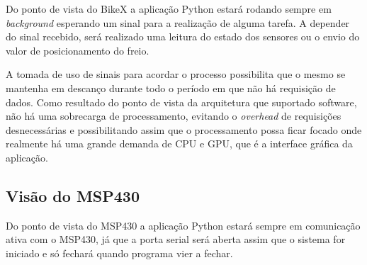Do ponto de vista do BikeX a aplicação Python estará rodando sempre em \textit{background} esperando um sinal para a realização de alguma tarefa. A depender do sinal recebido, será realizado uma leitura do estado dos sensores ou o envio do valor de posicionamento do freio.

A tomada de uso de sinais para acordar o processo possibilita que o mesmo se mantenha em descanço durante todo o período em que não há requisição de dados. Como resultado do ponto de vista da arquitetura que suportado software, não há uma sobrecarga de processamento, evitando o \textit{overhead} de requisições desnecessárias e possibilitando assim que o processamento possa ficar focado onde realmente há uma grande demanda de CPU e GPU, que é a interface gráfica da aplicação.

\subsection{Visão do MSP430} %
\label{sub:vis_o_do_msp430}

Do ponto de vista do MSP430 a aplicação Python estará sempre em comunicação ativa com o MSP430, já que a porta serial será aberta assim que o sistema for iniciado e só fechará quando programa vier a fechar.
